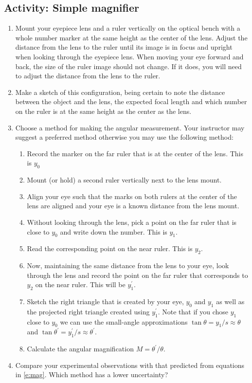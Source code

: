 \subsection{Activity: Simple magnifier}
\begin{enumerate}
	 \item Mount your eyepiece lens and a ruler vertically on the optical bench with a whole number marker at the same height as the center of the lens.  Adjust the distance from the lens to the ruler until its image is in focus and upright when looking through the eyepiece lens.  When moving your eye forward and back, the size of the ruler image should not change.  If it does, you will need to adjust the distance from the lens to the ruler.  
	 \item Make a sketch of this configuration, being certain to note the distance between the object and the lens, the expected focal length and which number on the ruler is at the same height as the center as the lens.
	 \item Choose a method for making the angular measurement.  Your instructor may suggest a preferred method otherwise you may use the following method:
	 \begin{enumerate}
	 	\item
			Record the marker on the far ruler that is at the center of the lens.  This is $y_{0}$
	 	\item
	 		Mount (or hold) a second ruler vertically next to the lens mount.
		\item
			Align your eye such that the marks on both rulers at the center of the lens are aligned and your eye is a known distance from the lens mount.
		\item
			Without looking through the lens, pick a point on the far ruler that is close to $y_{0}$ and write down the number.  This is $y_{1}$.
		\item
			Read the corresponding point on the near ruler.  This is $y_{2}$.
		\item
			Now, maintaining the same distance from the lens to your eye, look through the lens and record the point on the far ruler that corresponds to $y_{2}$ on the near ruler.  This will be $y_{1}^{\prime}$.
		\item
			Sketch the right triangle that is created by your eye, $y_{0}$ and $y_{1}$ as well as the projected right triangle created using $y_{1}^{\prime}$.  Note that if you chose $y_{1}$ close to $y_{0}$ we can use the small-angle approximations $\tan\theta=y_{1}/s\approx\theta$ and $\tan\theta^{\prime}= y_{1}^{\prime}/s\approx\theta^{\prime}$.
		\item
			Calculate the angular magnification $M=\theta^{\prime}/\theta$.
	 \end{enumerate}
	 \item Compare your experimental observations with that predicted from equations in \ref{e:mag}.  Which method has a lower uncertainty?
\end{enumerate}

